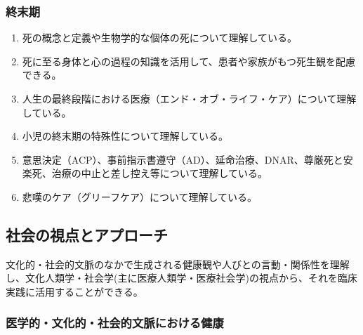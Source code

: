 \hypertarget{ux7d42ux672bux671f}{%
\subsubsection{終末期}\label{ux7d42ux672bux671f}}

\begin{enumerate}
\def\labelenumi{\arabic{enumi}.}
\tightlist
\item
  死の概念と定義や生物学的な個体の死について理解している。
\item
  死に至る身体と心の過程の知識を活用して、患者や家族がもつ死生観を配慮できる。
\item
  人生の最終段階における医療（エンド・オブ・ライフ・ケア）について理解している。
\item
  小児の終末期の特殊性について理解している。
\item
  意思決定（ACP）、事前指示書遵守（AD）、延命治療、DNAR、尊厳死と安楽死、治療の中止と差し控え等について理解している。
\item
  悲嘆のケア（グリーフケア）について理解している。
\end{enumerate}

\hypertarget{ux793eux4f1aux306eux8996ux70b9ux3068ux30a2ux30d7ux30edux30fcux30c1}{%
\subsection{社会の視点とアプローチ}\label{ux793eux4f1aux306eux8996ux70b9ux3068ux30a2ux30d7ux30edux30fcux30c1}}

文化的・社会的文脈のなかで生成される健康観や人びとの言動・関係性を理解し、文化人類学・社会学(主に医療人類学・医療社会学)の視点から、それを臨床実践に活用することができる。

\hypertarget{ux533bux5b66ux7684ux6587ux5316ux7684ux793eux4f1aux7684ux6587ux8108ux306bux304aux3051ux308bux5065ux5eb7}{%
\subsubsection{医学的・文化的・社会的文脈における健康}\label{ux533bux5b66ux7684ux6587ux5316ux7684ux793eux4f1aux7684ux6587ux8108ux306bux304aux3051ux308bux5065ux5eb7}}

